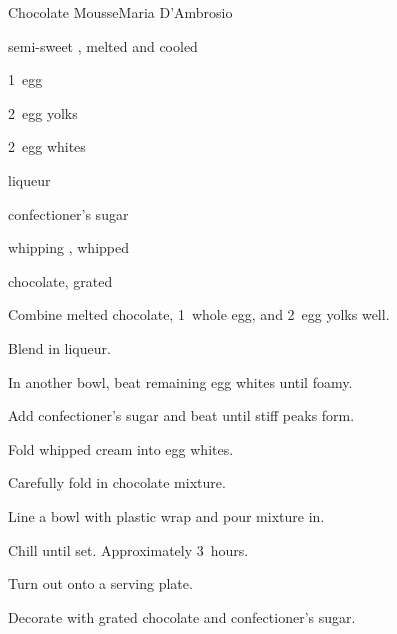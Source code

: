 \begin{recipe}{Chocolate Mousse}{Maria D'Ambrosio}{}

\begin{ingredients}
\item {} semi-sweet , melted and cooled
\item 1~egg
\item 2~egg yolks
\item 2~egg whites
\item {} liqueur
\item {} confectioner's sugar
\item {} whipping , whipped
\item {} chocolate, grated
\end{ingredients}

\begin{directions}
\item Combine melted chocolate, 1~whole egg, and 2~egg yolks well.
\item Blend in liqueur.
\item In another bowl, beat remaining egg whites until foamy.
\item Add confectioner's sugar and beat until stiff peaks form.
\item Fold whipped cream into egg whites.
\item Carefully fold in chocolate mixture.
\item Line a  bowl with plastic wrap and pour mixture in.
\item Chill until set. Approximately 3~hours.
\item Turn out onto a serving plate.
\item Decorate with grated chocolate and confectioner's sugar.
\end{directions}

\end{recipe}
